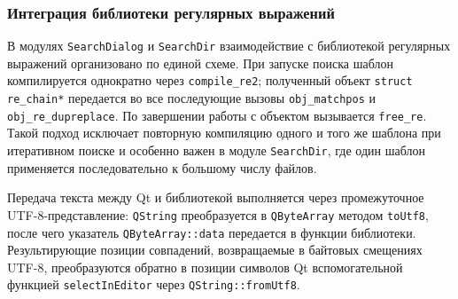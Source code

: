 \subsubsection{Интеграция библиотеки регулярных выражений}

В модулях \verb`SearchDialog` и \verb`SearchDir` взаимодействие с библиотекой регулярных выражений организовано по единой схеме. При запуске поиска шаблон компилируется однократно через \verb`compile_re2`; полученный объект \verb`struct re_chain*` передается во все последующие вызовы \verb`obj_matchpos` и \verb`obj_re_dupreplace`. По завершении работы с объектом вызывается \verb`free_re`. Такой подход исключает повторную компиляцию одного и того же шаблона при итеративном поиске и особенно важен в модуле \verb`SearchDir`, где один шаблон применяется последовательно к большому числу файлов.

Передача текста между Qt и библиотекой выполняется через промежуточное UTF-8-представление: \verb`QString` преобразуется в \verb`QByteArray` методом \verb`toUtf8`, после чего указатель \verb`QByteArray::data` передается в функции библиотеки. Результирующие позиции совпадений, возвращаемые в байтовых смещениях UTF-8, преобразуются обратно в позиции символов Qt вспомогательной функцией \verb`selectInEditor` через \verb`QString::fromUtf8`.